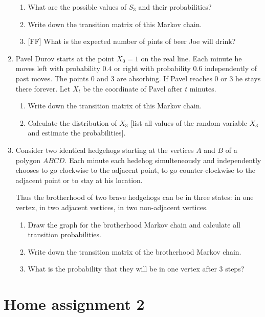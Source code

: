 \documentclass[12pt]{article}
\begin{document}
\begin{enumerate}
\begin{enumerate}[resume]
\item What are the possible values of $S_3$ and their probabilities?
\item Write down the transition matrix of this Markov chain.
\item {[FF]} What is the expected number of pints of beer Joe will drink?
\end{enumerate}

\item Pavel Durov starts at the point $X_0 = 1$ on the real line. 
Each minute he moves left with probability $0.4$ or right with probability $0.6$ independently of past moves.
The points $0$ and $3$ are absorbing. 
If Pavel reaches $0$ or $3$ he stays there forever.
Let $X_t$ be the coordinate of Pavel after $t$ minutes. 

\begin{enumerate}
    \item Write down the transition matrix of this Markov chain. 
    \item Calculate the distribution of $X_3$ [list all values of the random variable $X_3$ and estimate the probabilities].
\end{enumerate}


\item Consider two identical hedgehogs starting at the vertices $A$ and $B$ of a polygon $ABCD$. 
Each minute each hedehog simulteneously and independently chooses to go clockwise to the adjacent point, to go counter-clockwise to the adjacent point or to stay at his location.
    
Thus the brotherhood of two brave hedgehogs can be in three states: in one vertex, 
    in two adjacent vertices, in two non-adjacent vertices.

  
\begin{enumerate}
      \item Draw the graph for the brotherhood Markov chain and calculate all transition probabilities. 
      \item Write down the transition matrix of the brotherhood Markov chain. 
      \item What is the probability that they will be in one vertex after 3 steps?
\end{enumerate}


\end{enumerate}

\section*{Home assignment 2}
\end{document}
